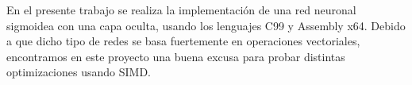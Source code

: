 
En el presente trabajo se realiza la implementación de una red neuronal sigmoidea con una capa oculta, usando los lenguajes C99 y Assembly x64. Debido a que dicho tipo de redes se basa fuertemente en operaciones vectoriales, encontramos en este proyecto una buena excusa para probar distintas optimizaciones usando SIMD.
